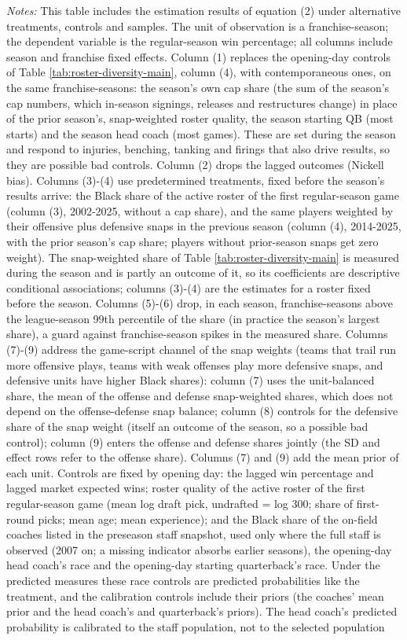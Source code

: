 {\footnotesize
\noindent\textit{Notes:} This table includes the estimation results of equation (2) under alternative treatments, controls and samples. The unit of observation is a franchise-season; the dependent variable is the regular-season win percentage; all columns include season and franchise fixed effects. Column (1) replaces the opening-day controls of Table \ref{tab:roster-diversity-main}, column (4), with contemporaneous ones, on the same franchise-seasons: the season's own cap share (the sum of the season's cap numbers, which in-season signings, releases and restructures change) in place of the prior season's, snap-weighted roster quality, the season starting QB (most starts) and the season head coach (most games). These are set during the season and respond to injuries, benching, tanking and firings that also drive results, so they are possible bad controls. Column (2) drops the lagged outcomes (Nickell bias). Columns (3)-(4) use predetermined treatments, fixed before the season's results arrive: the Black share of the active roster of the first regular-season game (column (3), 2002-2025, without a cap share), and the same players weighted by their offensive plus defensive snaps in the previous season (column (4), 2014-2025, with the prior season's cap share; players without prior-season snaps get zero weight). The snap-weighted share of Table \ref{tab:roster-diversity-main} is measured during the season and is partly an outcome of it, so its coefficients are descriptive conditional associations; columns (3)-(4) are the estimates for a roster fixed before the season. Columns (5)-(6) drop, in each season, franchise-seasons above the league-season 99th percentile of the share (in practice the season's largest share), a guard against franchise-season spikes in the measured share.  Columns (7)-(9) address the game-script channel of the snap weights (teams that trail run more offensive plays, teams with weak offenses play more defensive snaps, and defensive units have higher Black shares): column (7) uses the unit-balanced share, the mean of the offense and defense snap-weighted shares, which does not depend on the offense-defense snap balance; column (8) controls for the defensive share of the snap weight (itself an outcome of the season, so a possible bad control); column (9) enters the offense and defense shares jointly (the SD and effect rows refer to the offense share). Columns (7) and (9) add the mean prior of each unit. Controls are fixed by opening day: the lagged win percentage and lagged market expected wins; roster quality of the active roster of the first regular-season game (mean log draft pick, undrafted = log 300; share of first-round picks; mean age; mean experience); and the Black share of the on-field coaches listed in the preseason staff snapshot, used only where the full staff is observed (2007 on; a missing indicator absorbs earlier seasons), the opening-day head coach's race and the opening-day starting quarterback's race. Under the predicted measures these race controls are predicted probabilities like the treatment, and the calibration controls include their priors (the coaches' mean prior and the head coach's and quarterback's priors). The head coach's predicted probability is calibrated to the staff population, not to the selected population }
